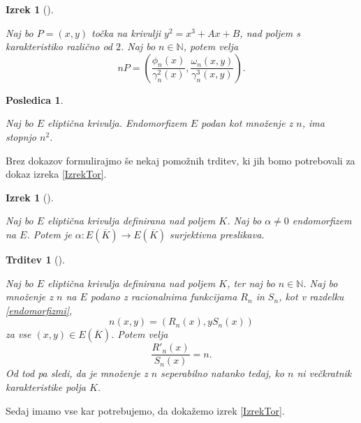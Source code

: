 \documentclass[12pt,a4paper,twoside]{article}
\theoremstyle{definition} %
\theoremstyle{plain} %
\newtheorem{izrek}[definicija]{Izrek}
\newtheorem{trditev}[definicija]{Trditev}
\newtheorem{posledica}[definicija]{Posledica}
\numberwithin{equation}{section}  %
\newcommand{\N}{\mathbb N}
\newcommand{\E}[1]{E({#1})}
\begin{document}
\begin{izrek}[]~

\label{izrek:3.6}
Naj bo $P = (x,y)$ točka na krivulji $y^2 = x^3+Ax+B$, nad poljem s karakteristiko različno od $2$. Naj bo $n\in \N$, potem velja
$$nP = \left( \frac{\phi_n(x)}{\gamma^2_n(x)}, \frac{\omega_n(x,y)}{\gamma^3_n(x,y)}\right).$$


\end{izrek}

\begin{posledica}~

\label{posledica:3.7}
Naj bo $E$ eliptična krivulja. Endomorfizem $E$ podan kot množenje z $n$, ima stopnjo $n^2$.
\end{posledica}

Brez dokazov formulirajmo še nekaj pomožnih trditev, ki jih bomo potrebovali za dokaz izreka \ref{IzrekTor}.

\begin{izrek}[]~

\label{izrek:2.22}
Naj bo $E$ eliptična krivulja definirana nad poljem $K$. Naj bo $\alpha \neq 0$ endomorfizem na $E$. Potem je $\alpha: \E{\overline{K}} \rightarrow \E{\overline{K}}$ surjektivna preslikava.

\end{izrek}

\begin{trditev}[]~

\label{trditev:2.28}
Naj bo $E$ eliptična krivulja definirana nad poljem $K$, ter naj bo $n\in \N$. Naj bo množenje z $n$ na $E$ podano z racionalnima funkcijama $R_n$ in $S_n$, kot v razdelku \ref{endomorfizmi},
$$n(x,y) = (R_n(x),yS_n(x))$$
za vse $(x,y) \in \E{\overline{K}}$. Potem velja
$$\frac{R'_n(x)}{S_n(x)} = n.$$
Od tod pa sledi, da je množenje z $n$ seperabilno natanko tedaj, ko $n$ ni večkratnik karakteristike polja $K$. 
\end{trditev}

Sedaj imamo vse kar potrebujemo, da dokažemo izrek \ref{IzrekTor}.
\end{document}
